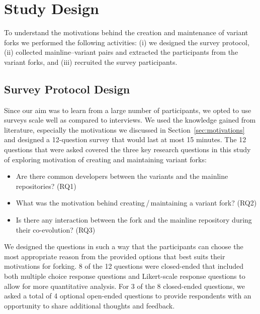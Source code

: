 \section{Study Design}
\label{sec:study_design}
To understand the motivations behind the creation and maintenance of variant forks we performed the following activities: (i) we designed the survey protocol, (ii) collected mainline--variant pairs and extracted the participants from the variant forks, and (iii) recruited the survey participants.


\subsection{Survey Protocol Design}
\label{sec:protocal}
Since our aim was to learn from a large number of participants, we opted to use surveys scale well as compared to interviews.
We used the knowledge gained from literature, especially the motivations we discussed in Section~\ref{sec:motivations} and designed a 12-question survey that would last at most 15 minutes. The 12 questions that were asked covered the three key research questions in this study of exploring motivation of creating and maintaining variant forks:

\begin{itemize}
\item Are there common developers between the variants and the mainline repositories? (RQ1)
\item What was the motivation behind creating\,/\,maintaining a variant fork? (RQ2)
\item Is there any interaction between the fork and the mainline repository during their co-evolution? (RQ3)
\end{itemize}

We designed the questions in such a way that the participants can choose the most appropriate reason from the provided options that best suits their motivations for forking. 8 of the 12 questions were closed-ended that included both multiple choice response questions and Likert-scale response questions to allow for more quantitative analysis. For 3 of the 8 closed-ended questions, we asked a total of 4 optional open-ended questions to provide respondents with an opportunity to share additional thoughts and feedback.

